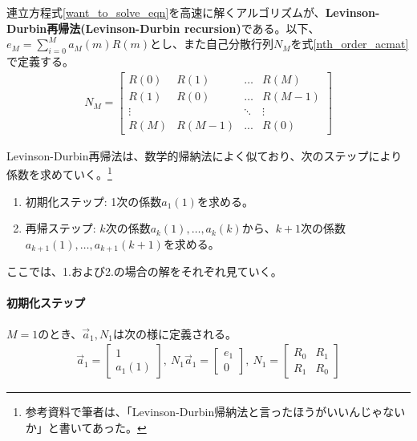 \documentclass[uplatex,dvipdfmx,b5j,10pt]{jsbook}
\theoremstyle{definition}
\begin{document}
連立方程式\ref{want_to_solve_eqn}を高速に解くアルゴリズムが、\textbf{Levinson-Durbin再帰法(Levinson-Durbin recursion)}である。以下、$e_{M} = \sum_{i=0}^{M} a_{M}(m) R(m)$とし、また自己分散行列$N_{M}$を式\ref{nth_order_acmat}で定義する。
\begin{eqnarray} \label{nth_order_acmat}
  N_{M} =
  \begin{bmatrix}
    R(0) & R(1) & \dots & R(M)   \\
    R(1) & R(0) & \dots & R(M-1) \\
    \vdots &       & \ddots   & \vdots  \\
    R(M) & R(M-1) & ... & R(0)
  \end{bmatrix}
\end{eqnarray}

Levinson-Durbin再帰法は、数学的帰納法によく似ており、次のステップにより係数を求めていく。\footnote{参考資料\cite{englishlevinsondubin}で筆者は、「Levinson-Durbin帰納法と言ったほうがいいんじゃないか」と書いてあった。}

\begin{enumerate}
  \item 初期化ステップ: 1次の係数$a_{1}(1)$を求める。
  \item 再帰ステップ: $k$次の係数$a_{k}(1),\dots,a_{k}(k)$から、$k+1$次の係数$a_{k+1}(1),\dots,a_{k+1}(k+1)$を求める。
\end{enumerate}

ここでは、1.および2.の場合の解をそれぞれ見ていく。

\paragraph{初期化ステップ}
$M=1$のとき、$\vec{a}_{1}, N_{1}$は次の様に定義される。
\begin{eqnarray*}
  \vec{a}_{1}=
  \begin{bmatrix}
    1 \\ 
    a_{1}(1)
  \end{bmatrix}
  ,\ 
  N_{1}\vec{a}_{1}=
  \begin{bmatrix}
    e_{1} \\ 
    0
  \end{bmatrix}
  ,\ 
  N_{1}=
  \begin{bmatrix}
    R_{0} & R_{1} \\ 
    R_{1} & R_{0}
  \end{bmatrix}
\end{eqnarray*}
\end{document}
